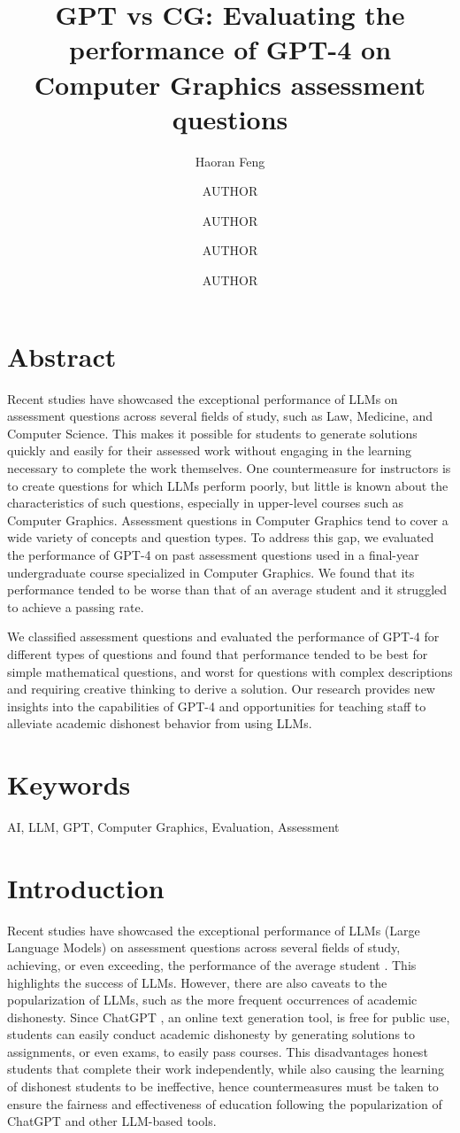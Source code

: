 \documentclass[sigconf,authordraft]{acmart}
\title{GPT vs CG: Evaluating the performance of GPT-4 on Computer Graphics assessment questions}
\date{\vspace{-5ex}}
\author{Haoran Feng}
\affiliation{
  \institution{University of Auckland}
  \city{Auckland}
  \country{New Zealand}
}
\author{AUTHOR}
\affiliation{
  \institution{University of Auckland}
  \city{Auckland}
  \country{New Zealand}
}
\author{AUTHOR}
\affiliation{
  \institution{University of Auckland}
  \city{Auckland}
  \country{New Zealand}
}
\author{AUTHOR}
\affiliation{
  \institution{University of Auckland}
  \city{Auckland}
  \country{New Zealand}
}
\author{AUTHOR}
\affiliation{
  \institution{University of Auckland}
  \city{Auckland}
  \country{New Zealand}
}
\begin{document}
\maketitle

\section*{Abstract}
Recent studies have showcased the exceptional performance of LLMs on assessment questions across several fields of study, such as Law, Medicine, and Computer Science. This makes it possible for students to generate solutions quickly and easily for their assessed work without engaging in the learning necessary to complete the work themselves. One countermeasure for instructors is to create questions for which LLMs perform poorly, but little is known about the characteristics of such questions, especially in upper-level courses such as Computer Graphics.  Assessment questions in Computer Graphics tend to cover a wide variety of concepts and question types.  To address this gap, we evaluated the performance of GPT-4 on past assessment questions used in a final-year undergraduate course specialized in Computer Graphics. We found that its performance tended to be worse than that of an average student and it struggled to achieve a passing rate. 

We classified assessment questions and evaluated the performance of GPT-4 for different types of questions and found that performance tended to be best for simple mathematical questions, and worst for questions with complex descriptions and requiring creative thinking to derive a solution. Our research provides new insights into the capabilities of GPT-4 and opportunities for teaching staff to alleviate academic dishonest behavior from using LLMs. 

\section*{Keywords}
AI, LLM, GPT, Computer Graphics, Evaluation, Assessment

\section{Introduction}
Recent studies have showcased the exceptional performance of LLMs (Large Language Models) on assessment questions across several fields of study, achieving, or even exceeding, the performance of the average student \cite{testcodex, testcopilot, testgpt, testbar, testmed}. This highlights the success of LLMs. However, there are also caveats to the popularization of LLMs, such as the more frequent occurrences of academic dishonesty. Since ChatGPT \cite{chatgpt}, an online text generation tool, is free for public use, students can easily conduct academic dishonesty by generating solutions to assignments, or even exams, to easily pass courses. This disadvantages honest students that complete their work independently, while also causing the learning of dishonest students to be ineffective, hence countermeasures must be taken to ensure the fairness and effectiveness of education following the popularization of ChatGPT and other LLM-based tools.
\end{document}
